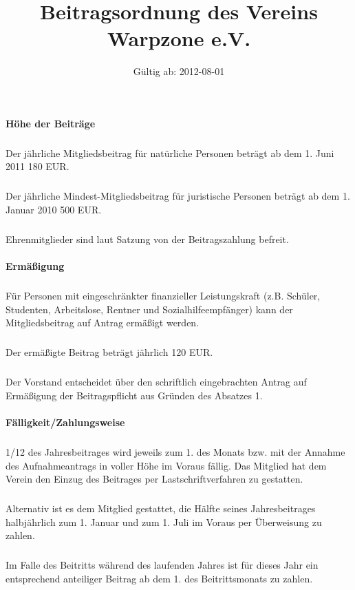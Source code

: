 \documentclass[a4paper]{article}
\title{Beitragsordnung des Vereins Warpzone e.V.}
\date{Gültig ab: 2012-08-01}
\begin{document}
\maketitle

\paragraph{Höhe der Beiträge}
\subparagraph{}
Der jährliche Mitgliedsbeitrag für natürliche Personen beträgt ab dem 1.
Juni 2011 180 EUR.
\subparagraph{} Der jährliche Mindest-Mitgliedsbeitrag für juristische Personen beträgt ab
dem 1. Januar 2010 500 EUR.
\subparagraph{} Ehrenmitglieder sind laut Satzung von der Beitragszahlung befreit.

\paragraph{Ermäßigung}
\subparagraph{} Für Personen mit eingeschränkter finanzieller Leistungskraft (z.B. Schüler,
Studenten, Arbeitslose, Rentner und Sozialhilfeempfänger) kann der
Mitgliedsbeitrag auf Antrag ermäßigt werden.
\subparagraph{} Der ermäßigte Beitrag beträgt jährlich 120 EUR.
\subparagraph{} Der Vorstand entscheidet über den schriftlich eingebrachten Antrag auf
Ermäßigung der Beitragspflicht aus Gründen des Absatzes 1.

\paragraph{Fälligkeit/Zahlungsweise}
\subparagraph{} 1/12 des Jahresbeitrages wird jeweils zum 1. des Monats bzw. mit der
Annahme des Aufnahmeantrags in voller Höhe im Voraus fällig. Das Mitglied
hat dem Verein den Einzug des Beitrages per Lastschriftverfahren zu gestatten.
\subparagraph{} Alternativ ist es dem Mitglied gestattet, die Hälfte seines Jahresbeitrages
halbjährlich zum 1. Januar und zum 1. Juli im Voraus per Überweisung zu
zahlen.
\subparagraph{} Im Falle des Beitritts während des laufenden Jahres ist für dieses Jahr ein
entsprechend anteiliger Beitrag ab dem 1. des Beitrittsmonats zu zahlen.
\end{document}
